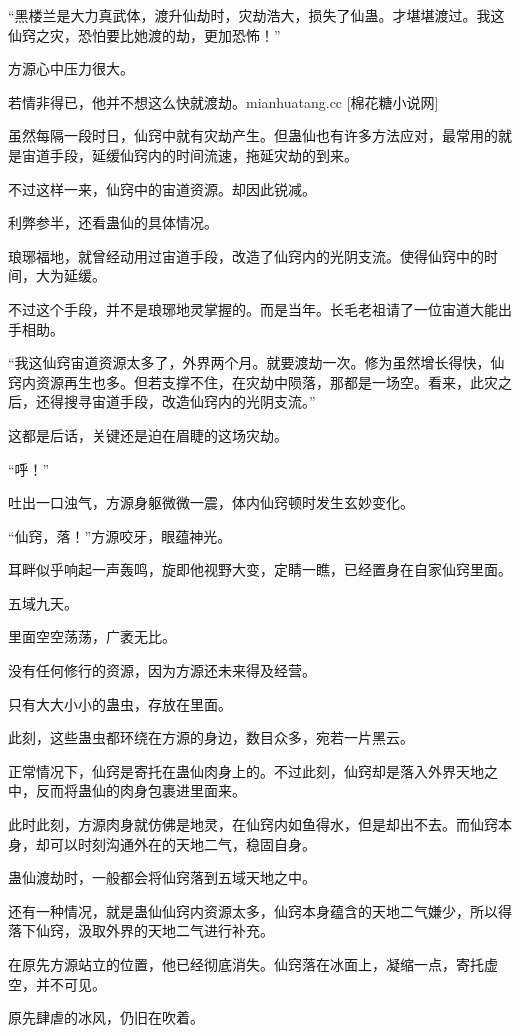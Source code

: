 \begin{this_body}
“黑楼兰是大力真武体，渡升仙劫时，灾劫浩大，损失了仙蛊。才堪堪渡过。我这仙窍之灾，恐怕要比她渡的劫，更加恐怖！”

方源心中压力很大。

若情非得已，他并不想这么快就渡劫。mianhuatang.cc [棉花糖小说网]

虽然每隔一段时日，仙窍中就有灾劫产生。但蛊仙也有许多方法应对，最常用的就是宙道手段，延缓仙窍内的时间流速，拖延灾劫的到来。

不过这样一来，仙窍中的宙道资源。却因此锐减。

利弊参半，还看蛊仙的具体情况。

琅琊福地，就曾经动用过宙道手段，改造了仙窍内的光阴支流。使得仙窍中的时间，大为延缓。

不过这个手段，并不是琅琊地灵掌握的。而是当年。长毛老祖请了一位宙道大能出手相助。

“我这仙窍宙道资源太多了，外界两个月。就要渡劫一次。修为虽然增长得快，仙窍内资源再生也多。但若支撑不住，在灾劫中陨落，那都是一场空。看来，此灾之后，还得搜寻宙道手段，改造仙窍内的光阴支流。”

这都是后话，关键还是迫在眉睫的这场灾劫。

“呼！”

吐出一口浊气，方源身躯微微一震，体内仙窍顿时发生玄妙变化。

“仙窍，落！”方源咬牙，眼蕴神光。

耳畔似乎响起一声轰鸣，旋即他视野大变，定睛一瞧，已经置身在自家仙窍里面。

五域九天。

里面空空荡荡，广袤无比。

没有任何修行的资源，因为方源还未来得及经营。

只有大大小小的蛊虫，存放在里面。

此刻，这些蛊虫都环绕在方源的身边，数目众多，宛若一片黑云。

正常情况下，仙窍是寄托在蛊仙肉身上的。不过此刻，仙窍却是落入外界天地之中，反而将蛊仙的肉身包裹进里面来。

此时此刻，方源肉身就仿佛是地灵，在仙窍内如鱼得水，但是却出不去。而仙窍本身，却可以时刻沟通外在的天地二气，稳固自身。

蛊仙渡劫时，一般都会将仙窍落到五域天地之中。

还有一种情况，就是蛊仙仙窍内资源太多，仙窍本身蕴含的天地二气嫌少，所以得落下仙窍，汲取外界的天地二气进行补充。

在原先方源站立的位置，他已经彻底消失。仙窍落在冰面上，凝缩一点，寄托虚空，并不可见。

原先肆虐的冰风，仍旧在吹着。


\end{this_body}
